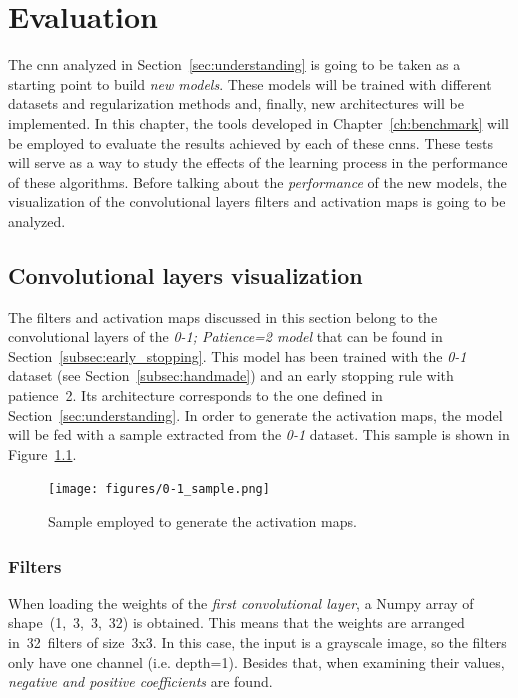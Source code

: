 \chapter{Evaluation}\label{sec:new_models}
The \gls{cnn} analyzed in Section~\ref{sec:understanding} is going to be taken as a starting point to build \emph{new models}. These models will be trained with different datasets and regularization methods and, finally, new architectures will be implemented. In this chapter, the tools developed in Chapter~\ref{ch:benchmark} will be employed to evaluate the results achieved by each of these \glspl{cnn}. These tests will serve as a way to study the effects of the learning process in the performance of these algorithms. Before talking about the \emph{performance} of the new models, the visualization of the convolutional layers filters and activation maps is going to be analyzed.

\section{Convolutional layers visualization}
The filters and activation maps discussed in this section belong to the convolutional layers of the \emph{\textit{0-1; Patience=2} model} that can be found in Section~\ref{subsec:early_stopping}. This model has been trained with the \textit{0-1} dataset (see Section~\ref{subsec:handmade}) and an early stopping rule with patience~2. Its architecture corresponds to the one defined in Section~\ref{sec:understanding}. In order to generate the activation maps, the model will be fed with a sample extracted from the \textit{0-1} dataset. This sample is shown in Figure~\ref{fig:sample}.
\begin{figure}
	\centering
	\texttt{[image: figures/0-1\_sample.png]}
	\caption{Sample employed to generate the activation maps.}
	\label{fig:sample}
\end{figure}

\subsection{Filters}
When loading the weights of the \emph{first convolutional layer}, a Numpy array of shape~(1,~3,~3,~32) is obtained. This means that the weights are arranged in~32~filters of size~3x3. In this case, the input is a grayscale image, so the filters only have one channel (i.e. depth=1). Besides that, when examining their values, \emph{negative and positive coefficients} are found.

